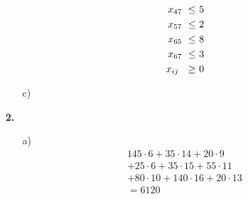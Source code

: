 \documentclass [a4paper,11pt]{article}
\begin{document}
\begin{enumerate}
\begin{enumerate}
\begin{align*}
\begin{alignedat}{6}
                &&        &    &         &    &         &    &\ x_{47} &\ \leq &\ 5 \\
                &&        &    &         &    &         &    &\ x_{57} &\ \leq &\ 2 \\
                &&        &    &         &    &         &    &\ x_{65} &\ \leq &\ 8 \\
                &&        &    &         &    &         &    &\ x_{67} &\ \leq &\ 3 \\
                && & & & & & & \llap{ $ x_{ij} $ } &\ \geq &\ 0
                \end{alignedat}
                \end{align*}

            \item[c)]

        \end{enumerate}

        \item[\textbf{2.}]
        \begin{enumerate}
            \item[a)]
                \begin{align*}
                145 \cdot 6 + 35 \cdot 14 + 20 \cdot 9 \\
                + 25 \cdot 6 + 35 \cdot 15 + 55 \cdot 11 \\
                + 80 \cdot 10 + 140 \cdot 16 + 20 \cdot 13 \\
                =6120
                \end{align*}


\end{enumerate}
\end{enumerate}
\end{document}
